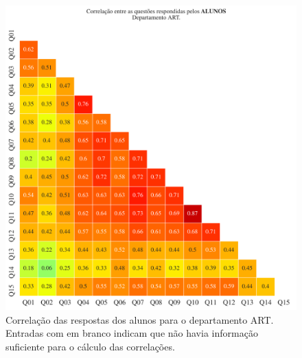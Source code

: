 \documentclass[a4paper,10pt]{article}
\begin{document}
\begin{figure}[h]
\centering
\includegraphics[width=0.999\linewidth]{matriz_corr__ART_alunos.png}
\caption{\label{fig:corr_alunos}Correlação das respostas dos alunos para o departamento ART. Entradas com em branco indicam que não havia informação suficiente para o cálculo das correlações.}
\end{figure}
\end{document}
